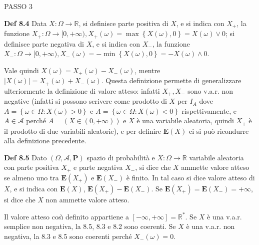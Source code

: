 \documentclass{article}
\begin{document}
PASSO 3

\textbf{Def 8.4 }Data $X:\Omega \rightarrow 
\mathbb{R}
$, si definisce parte positiva di $X$, e si indica con $X_{+}$, la funzione $%
X_{+}:\Omega \rightarrow \lbrack 0,+\infty ),X_{+}\left( \omega \right)
=\max \left\{ X\left( \omega \right) ,0\right\} =X\left( \omega \right) \vee
0$; si definisce parte negativa di $X$, e si indica con $X_{-}$, la funzione 
$X_{-}:\Omega \rightarrow \lbrack 0,+\infty ),X_{-}\left( \omega \right)
=-\min \left\{ X\left( \omega \right) ,0\right\} =-X\left( \omega \right)
\wedge 0$.

Vale quindi $X\left( \omega \right) =X_{+}\left( \omega \right) -X_{-}\left(
\omega \right) $, mentre $\left\vert X\left( \omega \right) \right\vert
=X_{+}\left( \omega \right) +X_{-}\left( \omega \right) $. Questa
definizione permette di generalizzare ulteriormente la definizione di valore
atteso: infatti $X_{+},X_{-}$ sono v.a.r. non negative (infatti si possono
scrivere come prodotto di $X$ per $I_{A}$ dove $A=\left\{ \omega \in \Omega
:X\left( \omega \right) >0\right\} $ e $A=\left\{ \omega \in \Omega :X\left(
\omega \right) <0\right\} $ rispettivamente, e $A\in \mathcal{A}$ perch\'{e} 
$A=\left( X\in \left( 0,+\infty \right) \right) $ e $X$ \`{e} una variabile
aleatoria, quindi $X_{+}$ \`{e} il prodotto di due variabili aleatorie), e
per definire $\mathbf{E}\left( X\right) $ ci si pu\`{o} ricondurre alla
definizione precedente.

\textbf{Def 8.5 }Dato $\left( \Omega ,\mathcal{A},\mathbf{P}\right) $ spazio
di probabilit\`{a} e $X:\Omega \rightarrow 
\mathbb{R}
$ variabile aleatoria con parte positiva $X_{+}$ e parte negativa $X_{-}$,
si dice che $X$ ammette valore atteso se almeno uno tra $\mathbf{E}\left(
X_{+}\right) $ e $\mathbf{E}\left( X_{-}\right) $ \`{e} finito. In tal caso
si dice valore atteso di $X$, e si indica con $\mathbf{E}\left( X\right) $, $%
\mathbf{E}\left( X_{+}\right) -\mathbf{E}\left( X_{-}\right) $. Se $\mathbf{E%
}\left( X_{+}\right) =\mathbf{E}\left( X_{-}\right) =+\infty $, si dice che $%
X$ non ammette valore atteso.

Il valore atteso cos\`{\i} definito appartiene a $\left[ -\infty ,+\infty %
\right] =%
\mathbb{R}
^{\ast }$. Se $X$ \`{e} una v.a.r. semplice non negativa, la 8.5, 8.3 e 8.2
sono coerenti. Se $X$ \`{e} una v.a.r. non negativa, la 8.3 e 8.5 sono
coerenti perch\'{e} $X_{-}\left( \omega \right) =0$.
\end{document}
